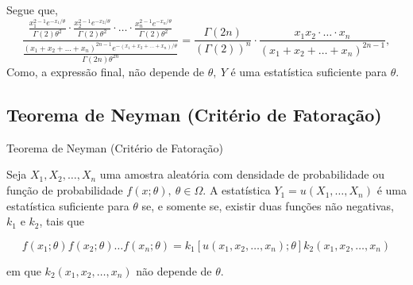 \documentclass[12pt]{beamer}
\begin{document}
\begin{frame}{}
\begin{block}{}
\justifying
Segue que,
\begin{equation*}
\dfrac{\frac{x_1^{2-1}e^{-x_1/\theta}}{\Gamma(2)\theta^2} \cdot \frac{x_2^{2-1}e^{-x_2/\theta}}{\Gamma(2)\theta^2} \cdot \ldots \cdot \frac{x_n^{2-1}e^{-x_n/\theta}}{\Gamma(2)\theta^2}}{\frac{(x_1 + x_2 + \ldots + x_n)^{2n-1}e^{-(x_1+x_2+\ldots+x_n)/\theta}}{\Gamma(2n)\theta^{2n}}}=\frac{\Gamma(2n)}{(\Gamma(2))^n} \cdot \frac{x_1x_2\cdot\ldots\cdot x_n}{(x_1 + x_2 + \ldots + x_n)^{2n-1}},
\end{equation*}
Como, a expressão final, não depende de $\theta,~Y$ é uma estatística suficiente para $\theta.$ 
\end{block}
\end{frame}

\subsection{Teorema de Neyman (Critério de Fatoração)}
\begin{frame}{Teorema de Neyman (Critério de Fatoração)}
\begin{block}{}
\begin{Teorema}
\justifying
    Seja $X_1, X_2, \ldots, X_n$ uma amostra aleatória com densidade de probabilidade ou função de probabilidade $f(x; \theta), ~\theta \in \Omega$. A estatística $Y_1 = u(X_1, \ldots, X_n)$ é uma estatística suficiente para $\theta$ se, e somente se, existir duas funções não negativas, $k_1$ e $k_2$, tais que

\begin{equation*}
f(x_1; \theta)f(x_2; \theta) \ldots f(x_n; \theta) = k_1[u(x_1, x_2, \ldots, x_n); \theta]k_2(x_1, x_2, \ldots, x_n)
\end{equation*}

em que $k_2(x_1, x_2, \ldots, x_n)$ não depende de $\theta$.
\end{Teorema}
\end{block}
\end{frame}
\end{document}
